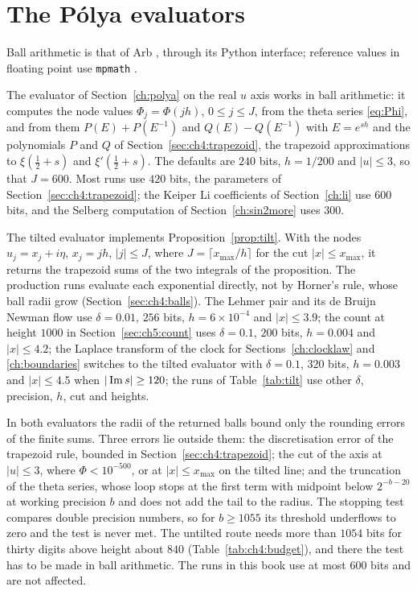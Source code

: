 \chapter{The P\'olya evaluators}\label{app:code}

Ball arithmetic is that of Arb \cite{Arb}, through its Python interface; reference values in floating point use \texttt{mpmath} \cite{mpmath}.
\label{app:code:eval}

The evaluator of Section~\ref{ch:polya} on the real $u$ axis works in ball arithmetic: it computes the node values $\Phi_j=\Phi(jh)$, $0\le j\le J$, from the theta series \eqref{eq:Phi}, and from them $P(E)+P(E^{-1})$ and $Q(E)-Q(E^{-1})$ with $E=e^{sh}$ and the polynomials $P$ and $Q$ of Section~\ref{sec:ch4:trapezoid}, the trapezoid approximations to $\xi(\frac12+s)$ and $\xi'(\frac12+s)$. The defaults are $240$ bits, $h=1/200$ and $|u|\le3$, so that $J=600$. Most runs use $420$ bits, the parameters of Section~\ref{sec:ch4:trapezoid}; the Keiper Li coefficients of Section~\ref{ch:li} use $600$ bits, and the Selberg computation of Section~\ref{ch:sin2more} uses $300$.

The tilted evaluator implements Proposition~\ref{prop:tilt}. With the nodes $u_j=x_j+i\eta$, $x_j=jh$, $|j|\le J$, where $J=\lceil x_{\max}/h\rceil$ for the cut $|x|\le x_{\max}$, it returns the trapezoid sums of the two integrals of the proposition. The production runs evaluate each exponential directly, not by Horner's rule, whose ball radii grow (Section~\ref{sec:ch4:balls}). The Lehmer pair and its de Bruijn Newman flow use $\delta=0.01$, $256$ bits, $h=6\times10^{-4}$ and $|x|\le3.9$; the count at height $1000$ in Section~\ref{sec:ch5:count} uses $\delta=0.1$, $200$ bits, $h=0.004$ and $|x|\le4.2$; the Laplace transform of the clock for Sections~\ref{ch:clocklaw} and \ref{ch:boundaries} switches to the tilted evaluator with $\delta=0.1$, $320$ bits, $h=0.003$ and $|x|\le4.5$ when $|\operatorname{Im} s|\ge120$; the runs of Table~\ref{tab:tilt} use other $\delta$, precision, $h$, cut and heights.

In both evaluators the radii of the returned balls bound only the rounding errors of the finite sums. Three errors lie outside them: the discretisation error of the trapezoid rule, bounded in Section~\ref{sec:ch4:trapezoid}; the cut of the axis at $|u|\le3$, where $\Phi<10^{-500}$, or at $|x|\le x_{\max}$ on the tilted line; and the truncation of the theta series, whose loop stops at the first term with midpoint below $2^{-b-20}$ at working precision $b$ and does not add the tail to the radius. The stopping test compares double precision numbers, so for $b\ge1055$ its threshold underflows to zero and the test is never met. The untilted route needs more than $1054$ bits for thirty digits above height about $840$ (Table~\ref{tab:ch4:budget}), and there the test has to be made in ball arithmetic. The runs in this book use at most $600$ bits and are not affected.
